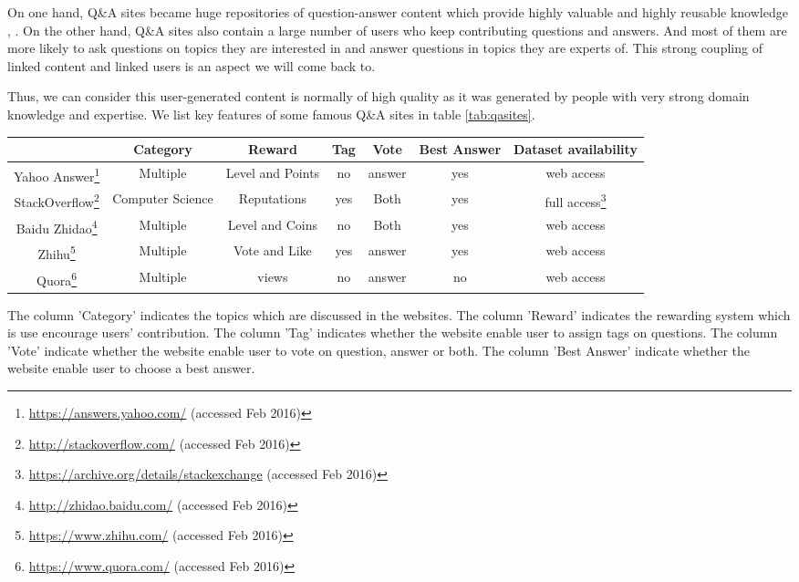 On one hand, Q\&A sites became huge repositories of question-answer content which provide highly valuable and highly reusable knowledge \cite{anderson2012discovering}, \cite{Shah:2010:EPA:1835449.1835518}. On the other hand, Q\&A sites also contain a large number of users who keep contributing questions and answers. And most of them are more likely to ask questions on topics they are interested in and answer questions in topics they are experts of. This strong coupling of linked content and linked users is an aspect we will come back to.

Thus, we can consider this user-generated content is normally of high quality as it was generated by people with very strong domain knowledge and expertise. We list key features of some famous Q\&A sites in table \ref{tab:qasites}. 

\begin{sidewaystable}%
\centering
\begin{tabular}{|c|c|c|c|c|c|c|}
\hline
& Category & Reward &  Tag & Vote &Best Answer&Dataset availability\\
\hline
Yahoo Answer\footnote{\url{https://answers.yahoo.com/} (accessed Feb 2016)} & Multiple & Level and Points & no& answer & yes & web access\\
\hline
StackOverflow\footnote{\url{http://stackoverflow.com/} (accessed Feb 2016)} &Computer Science & Reputations& yes&Both & yes& full access\footnote{\url{https://archive.org/details/stackexchange} (accessed Feb 2016)} \\
\hline
Baidu Zhidao\footnote{\url{http://zhidao.baidu.com/} (accessed Feb 2016)}& Multiple&Level and Coins & no &Both &yes&web access \\
\hline
Zhihu\footnote{\url{https://www.zhihu.com/} (accessed Feb 2016)} & Multiple & Vote and Like & yes & answer & yes& web access \\
\hline
Quora\footnote{\url{https://www.quora.com/} (accessed Feb 2016)} & Multiple&views& no & answer & no &web access\\
\hline
\end{tabular}
\caption{Key features of famous Q\&A sites}
\label{tab:qasites}
\end{sidewaystable}


The column 'Category' indicates the topics which are discussed in the websites.
The column 'Reward' indicates the rewarding system which is use encourage users' contribution.
The column 'Tag' indicates whether the website enable user to assign tags on questions.
The column 'Vote' indicate whether the website enable user to vote on question, answer or both.
The column 'Best Answer' indicate whether the website enable user to choose a best answer.




